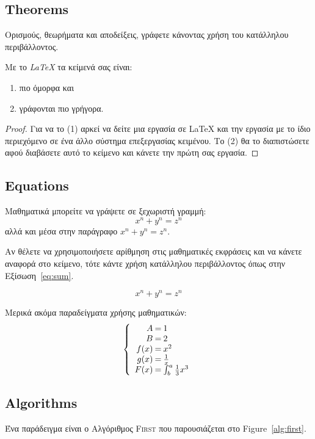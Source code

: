 \documentclass[a4paper,11pt]{article}
\begin{document}
%
%
\subsection{Theorems}\label{sec:theorem}
Ορισμούς, θεωρήματα και αποδείξεις, γράφετε κάνοντας χρήση του κατάλληλου περιβάλλοντος.

\begin{theorem}
Με το \emph{\LaTeX} \cite{Lamport86} τα κείμενά σας είναι: 
\begin{enumerate}
\item
πιο όμορφα και 
\item
γράφονται πιο γρήγορα.
\end{enumerate}
\end{theorem}

\begin{proof}
Για να το (1) αρκεί να δείτε μια εργασία σε {\LaTeX} και την εργασία με το ίδιο περιεχόμενο σε ένα άλλο σύστημα επεξεργασίας κειμένου.  Το (2) θα το διαπιστώσετε αφού διαβάσετε αυτό το κείμενο και κάνετε την πρώτη σας εργασία. 
\end{proof}

%
%
\subsection{Equations}\label{sec:math}
Μαθηματικά μπορείτε να γράψετε σε ξεχωριστή γραμμή:
\[ x^n + y^n = z^n \]
αλλά και μέσα στην παράγραφο $x^n + y^n = z^n$.

Αν θέλετε να χρησιμοποιήσετε αρίθμηση στις μαθηματικές εκφράσεις και να κάνετε αναφορά στο κείμενο, τότε κάντε χρήση κατάλληλου περιβάλλοντος όπως στην Εξίσωση~\ref{eq:sum}.

\begin{equation}
x^n + y^n = z^n
\label{eq:sum}    
\end{equation}

Μερικά ακόμα παραδείγματα χρήσης μαθηματικών:
\[\left\{
\begin{array}{r@{\:=\:}ll}
A & 1\\
B & 2\\
  f(x) & x^2\\
  g(x) & \frac{1}{x}\\
  F(x) & \int^a_b \frac{1}{3}x^3
\end{array}
\right.
\]

%
%
\subsection{Algorithms} \label{sec:alg}
Ένα παράδειγμα είναι ο Αλγόριθμος \textsc{First} που παρουσιάζεται στο Figure~\ref{alg:first}.
\end{document}
